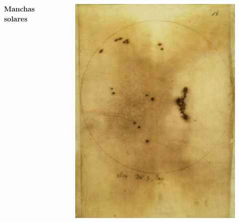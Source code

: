 \documentclass{beamer}
\begin{document}
\begin{frame}
 \begin{columns}
  \begin{center}  
  \Huge
   \textbf{Manchas solares}
  \end{center}  
   \begin{figure}
    \centering
    \includegraphics[scale=0.3]{Imagenes/m_s}
  \end{figure}
 \end{columns}
\end{frame}

\end{document}
